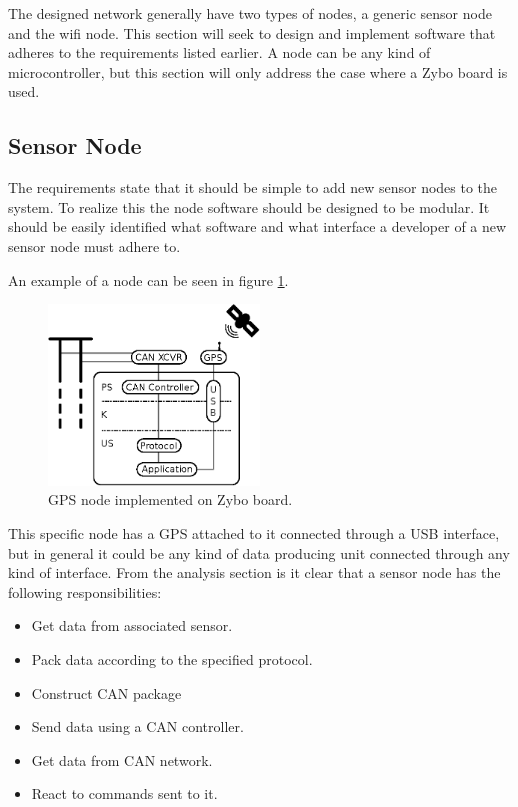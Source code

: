 The designed network generally have two types of nodes, a generic sensor node and the wifi node.
This section will seek to design and implement software that adheres to the requirements listed earlier.
A node can be any kind of microcontroller, but this section will only address the case where a Zybo board is used. 


\subsection{Sensor Node}
The requirements state that it should be simple to add new sensor nodes to the system. 
To realize this the node software should be designed to be modular.
It should be easily identified what software and what interface a developer of a new sensor node must adhere to.

An example of a node can be seen in figure \ref{fig:gps_node}.



\begin{figure}[!h]
\centering
\includegraphics[width=0.5\textwidth]{graphics/analysis_gps.eps}
\caption{GPS node implemented on Zybo board.}
\label{fig:gps_node}
\end{figure}

This specific node has a GPS attached to it connected through a USB interface, but in general it could be any kind of data producing unit connected through any kind of interface.
From the analysis section is it clear that a sensor node has the following responsibilities:

\begin{itemize}
\item Get data from associated sensor.
\item Pack data according to the specified protocol.
\item Construct CAN package
\item Send data using a CAN controller.
\item Get data from CAN network.
\item React to commands sent to it.
\end{itemize}

